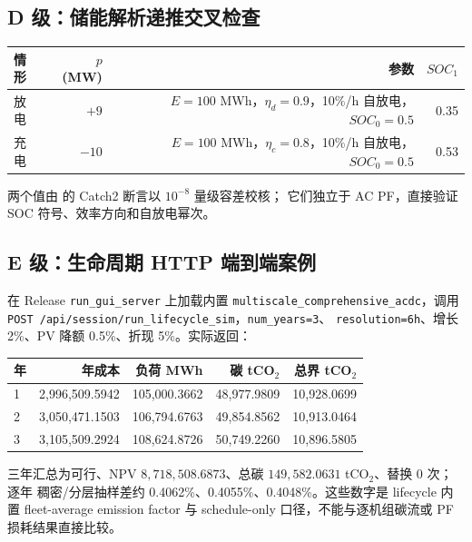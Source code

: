 \subsection{D 级：储能解析递推交叉检查}
\begin{center}\footnotesize
\begin{tabular}{@{}L{5.1cm}r r r@{}}
\toprule
情形 & $p$ (MW) & 参数 & $SOC_1$\\ \midrule
放电 & $+9$ & $E=100$ MWh，$\eta_d=0.9$，10\%/h 自放电，$SOC_0=0.5$ & 0.35\\
充电 & $-10$ & $E=100$ MWh，$\eta_c=0.8$，10\%/h 自放电，$SOC_0=0.5$ & 0.53\\
\bottomrule
\end{tabular}
\end{center}
两个值由  的 Catch2 断言以 $10^{-8}$ 量级容差校核；
它们独立于 AC PF，直接验证 SOC 符号、效率方向和自放电幂次。

\subsection{E 级：生命周期 HTTP 端到端案例}
在 Release \texttt{run\_gui\_server} 上加载内置
\texttt{multiscale\_comprehensive\_acdc}，调用
\texttt{POST /api/session/run\_lifecycle\_sim}，\texttt{num\_years=3}、
\texttt{resolution=6h}、增长 2\%、PV 降额 0.5\%、折现 5\%。实际返回：
\begin{center}\footnotesize
\begin{tabular}{@{}L{2.2cm}r r r r@{}}
\toprule
年 & 年成本 & 负荷 MWh & 碳 tCO$_2$ & 总界 tCO$_2$\\  & 2,996,509.5942 & 105,000.3662 & 48,977.9809 & 10,928.0699\\
2 & 3,050,471.1503 & 106,794.6763 & 49,854.8562 & 10,913.0464\\
3 & 3,105,509.2924 & 108,624.8726 & 50,749.2260 & 10,896.5805\\
\bottomrule
\end{tabular}
\end{center}
三年汇总为可行、NPV $8,718,508.6873$、总碳 $149,582.0631$ tCO$_2$、替换 0 次；逐年
稠密/分层抽样差约 0.4062\%、0.4055\%、0.4048\%。这些数字是 lifecycle 内置
fleet-average emission factor 与 schedule-only 口径，不能与逐机组碳流或 PF 损耗结果直接比较。

